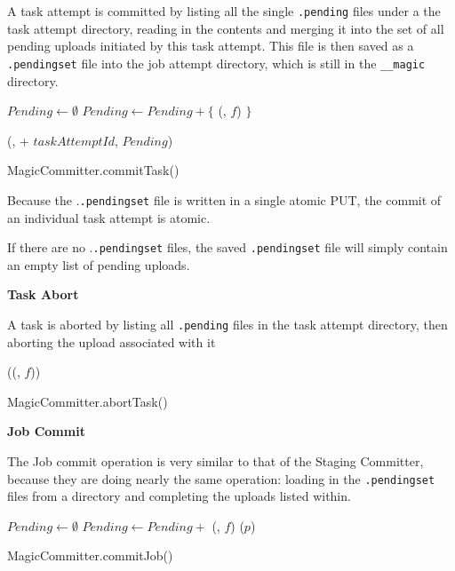 \documentclass[format=acmsmall, screen=true, review=false]{acmart}
\begin{document}

A task attempt is committed by listing all the single \texttt{.pending} files
under a the task attempt directory, reading in the contents and merging it
into the set of all pending uploads initiated by this task attempt.
This file is then saved as a \texttt{.pendingset} file into the job attempt directory,
which is still in the \texttt{__magic} directory.

\begin{procedure}
\MagicVars

  $Pending \longleftarrow \emptyset$\;
   {
    $Pending \longleftarrow Pending + \{$ \loadPendingFile(\fs, $f$) $\}$\;
  }

  \savePendingSet(\fs, \jobAttemptPath + $taskAttemptId$, $Pending$)\;

\caption{MagicCommitter.commitTask()}
\label{alg:MagicCommitter.commitTask}

\end{procedure}

Because the .\texttt{.pendingset} file is written in a single atomic PUT, the
commit of an individual task attempt is atomic.

If there are no .\texttt{.pendingset} files, the saved \texttt{.pendingset} file
will simply contain an empty list of pending uploads.


\textbf{Task Abort}

A task is aborted by listing all \texttt{.pending} files in the task attempt directory,
then aborting the upload associated with it

\begin{procedure}
  \MagicVars

   {
    \abortUpload(\loadPendingFile(\fs, $f$))\;
  }

  \caption{MagicCommitter.abortTask()}
  \label{alg:MagicCommitter.abortTask}
\end{procedure}


\textbf{Job Commit}

The Job commit operation is very similar to that of the Staging Committer, because
they are doing nearly the same operation: loading in the \texttt{.pendingset} files
from a directory and completing the uploads listed within.

\begin{procedure}
  \MagicVars

  $Pending \longleftarrow \emptyset$\;
   {
    $Pending \longleftarrow Pending + $ \loadPendingSet(\fs, $f$)\;
  }
   {
    \completeUpload($p$)\;
  }

  \caption{MagicCommitter.commitJob()}
  \label{alg:MagicCommitter.commitJob}
\end{procedure}
\end{document}
